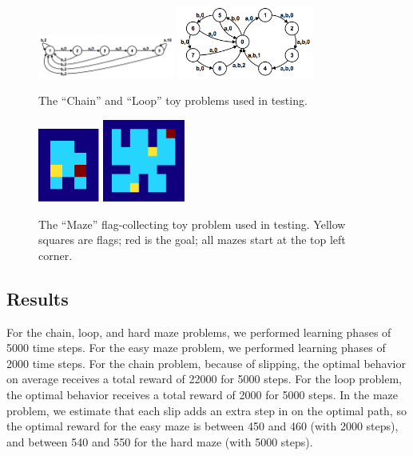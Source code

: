 \documentclass[10pt, twocolumn, twoside]{article}
\begin{document}
\begin{figure}[!htb]
\centering
\includegraphics[width=0.4\textwidth]{chain.png}
\includegraphics[width=0.4\textwidth]{loop.png}
\caption{\label{fig:chainloop} The ``Chain'' and ``Loop'' toy problems used in testing.}
\end{figure}

\begin{figure}[!htb]
\centering
\includegraphics[width=0.18\textwidth]{easymaze.png}
\includegraphics[width=0.24\textwidth]{hardmaze.png}
\caption{\label{fig:maze} The ``Maze'' flag-collecting toy problem used in testing.
Yellow squares are flags; red is the goal; all mazes start at the top left corner.}
\end{figure}

\subsection{Results}
For the chain, loop, and hard maze problems, we performed learning phases of 5000 time steps. For
the easy maze problem, we performed learning phases of 2000 time steps. For the chain problem,
because of slipping, the optimal behavior on average receives a total reward of 22000 for
5000 steps. For the loop problem, the optimal behavior receives a total reward of 2000
for 5000 steps. In the maze problem, we estimate that each slip adds an extra step in on the optimal
path, so the optimal reward for the easy maze is between 450 and 460 (with 2000 steps),
and between 540 and 550 for the hard maze (with 5000 steps).
\end{document}
